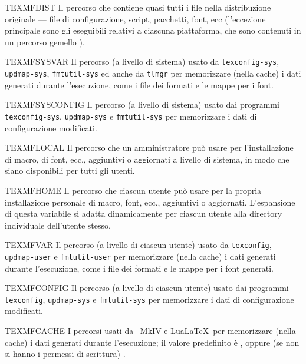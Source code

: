 \documentclass{article}
\begin{document}
\begin{ttdescription}
\item [TEXMFDIST] Il percorso che contiene quasi tutti i file nella
  distribuzione originale --- file di configurazione, script, pacchetti,
  font, ecc (l'eccezione principale sono gli eseguibili relativi a ciascuna
  piattaforma, che sono contenuti in un percorso gemello ).
\item [TEXMFSYSVAR] Il percorso (a livello di sistema) usato da
  \verb+texconfig-sys+, \verb+updmap-sys+, \verb+fmtutil-sys+ ed anche da
  \verb+tlmgr+ per memorizzare (nella cache) i dati generati durante 
  l'esecuzione, come i file dei formati e le mappe per i font.
\item [TEXMFSYSCONFIG] Il percorso (a livello di sistema) usato dai
  programmi \verb+texconfig-sys+, \verb+updmap-sys+ e \verb+fmtutil-sys+
  per memorizzare i dati di configurazione modificati.
\item [TEXMFLOCAL] Il percorso che un amministratore può usare per
  l'installazione di macro, di font, ecc., aggiuntivi o aggiornati a livello
  di sistema, in modo che siano disponibili per tutti gli utenti.
\item [TEXMFHOME] Il percorso che ciascun utente può usare per la propria
  installazione personale di macro, font, ecc., aggiuntivi o aggiornati.
  L'espansione di questa variabile si adatta dinamicamente per ciascun
  utente alla directory individuale dell'utente stesso.
\item [TEXMFVAR] Il percorso (a livello di ciascun utente) usato da
  \verb+texconfig+, \verb+updmap-user+ e \verb+fmtutil-user+ per memorizzare (nella 
  cache) i dati generati durante l'esecuzione, come i file dei formati e le
  mappe per i font generati.
\item [TEXMFCONFIG] Il percorso (a livello di ciascun utente) usato dai
  programmi \verb+texconfig+, \verb+updmap-sys+ e \verb+fmtutil-sys+ per
  memorizzare i dati di configurazione modificati.
\item [TEXMFCACHE] I percorsi usati da \ConTeXt\ MkIV e Lua\LaTeX\
  per memorizzare (nella cache) i dati generati durante l'esecuzione; il valore 
  predefinito è \code{TEXMFSYSVAR}, oppure (se non si hanno i permessi di
  scrittura) \code{TEXMFVAR}.
\end{ttdescription}
\end{document}
